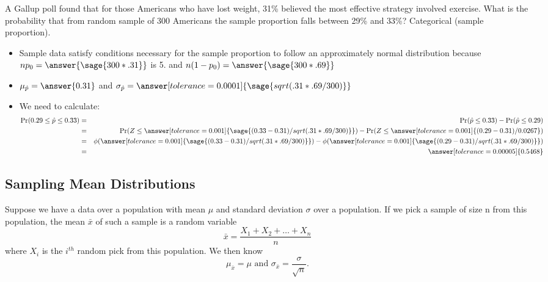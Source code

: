 \documentclass{ximera}
\begin{document}
\begin{problem}
A Gallup poll found that for those Americans who have lost weight, 31\% believed the most
effective strategy involved exercise. What is the probability that from random sample of 300
Americans the sample proportion falls between 29\% and 33\%? Categorical (sample proportion).  

\begin{explanation}
\begin{itemize} 
    \item Sample data  satisfy conditions necessary for the sample proportion to follow an
approximately normal distribution because $np_0=\answer{\sage{300*.31}}$ is 
 5.
and $n(1-p_0)=\answer{\sage{300*.69}}$
    
    \item $\mu_{\hat p}=\answer{0.31}$ and $\sigma_{\hat p}=\answer[tolerance=0.0001]{\sage{sqrt(.31*.69/300)}}$

    \item We need to calculate:    
\begin{eqnarray*}
\Pr(0.29\leq \hat p \leq 0.33)
&=&
\Pr(\hat p \leq 0.33) -\Pr(\hat p \leq 0.29)
\\
&=&
\Pr(Z \leq \answer[tolerance=0.001]{\sage{(0.33 - 0.31)/sqrt(.31*.69/300)} }) -\Pr(Z \leq \answer[tolerance=0.001]{(0.29 - 0.31)/0.0267 })
\\
&=& 
\phi(\answer[tolerance=0.001]{\sage{(0.33 - 0.31)/sqrt(.31*.69/300)} })-\phi(\answer[tolerance=0.001]{\sage{(0.29 - 0.31)/sqrt(.31*.69/300)} })
\\
&=&
\answer[tolerance=0.00005]{0.5468}
\end{eqnarray*}
\end{itemize}
\end{explanation}
\end{problem}

\subsection*{Sampling Mean Distributions}
Suppose we have a data over a population with mean $\mu$ and standard deviation $\sigma$ over a population. If we pick a sample of size n from this population, the mean $\bar x$ of such a sample is a random variable 
$$\bar{x}=\frac{X_1+X_2+\ldots+X_n}{n}$$
where $X_i$ is the $i^{th}$ random pick from this population. We then know
$$\mu_{\bar x}=\mu \mbox{ and } \sigma_{\bar x}=\frac{\sigma}{\sqrt{n}}.$$
\end{document}
